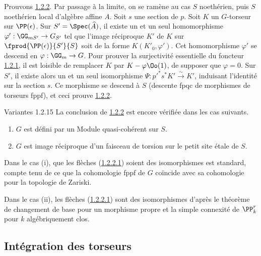 \subsubsection{}
Prouvons \hyperref[XVIII.thm1.2.2]{1.2.2}. Par passage à la limite, on se ramène au cas $S$
noethérien, puis $S$ noethérien local d'algèbre affine $A$. Soit $s$
une section de $p$. Soit $K$ un $G$-torseur sur
$\PP(\epsilon)$. Sur $S'=\Spec(\widehat{A})$, il existe un et
un seul homomorphisme $\varphi':\GG_{mS'}\rightarrow G_{S'}$
tel que l'image réciproque $K'$ de $K$ sur
$\fprod{\PP(\epsilon)}{S'}{S}$ soit de la forme
$K(K'_{0},\varphi')$. Cet homomorphisme $\varphi'$ se descend en
$\varphi:\GG_{m}\rightarrow G$. Pour prouver la surjectivité
essentielle du foncteur \hyperref[XVIII.subsubsec1.2.1]{1.2.1}, il est loisible de
remplacer $K$ par 
$K-\varphi\Oo(1)$, \ie de supposer que $\varphi=0$. Sur $S'$, il
existe alors un et un seul isomorphisme
$\Psi:{p'}^{\ast}s^{\ast}K'\xrightarrow{\sim}K'$, induisant l'identité
sur la section $s$. Ce morphisme se descend à $S$ (descente fpqc de
morphismes de torseurs fppf), et ceci prouve \hyperref[XVIII.thm1.2.2]{1.2.2}.

\begin{enonce*}{Variantes 1.2.15}
La conclusion de \hyperref[XVIII.thm1.2.2]{1.2.2} est encore vérifiée dans les cas
suivants.
\begin{enumerate}
\renewcommand{\theenumi}{\roman{enumi}}
\renewcommand{\labelenumi}{(\theenumi)}
\item $G$ est défini par un Module quasi-cohérent sur $S$.

\item $G$ est image réciproque d'un faisceau de torsion sur le petit
  site étale de $S$.
\end{enumerate}
\end{enonce*}

Dans le cas (i), que les flèches (\hyperref[XVIII.par1.2.2.1]{1.2.2.1}) soient des
isomorphismes 
est standard, compte tenu de ce que la cohomologie fppf de $G$
coïncide avec sa cohomologie pour la topologie de Zariski.

Dans le cas (ii), les flèches (\hyperref[XVIII.par1.2.2.1]{1.2.2.1}) sont des
isomorphismes d'après 
le théorème de changement de base pour un morphisme propre et la
simple connexité de $\PP^{r}_{k}$ pour $k$ algébriquement clos.

\subsection{Intégration des torseurs}

